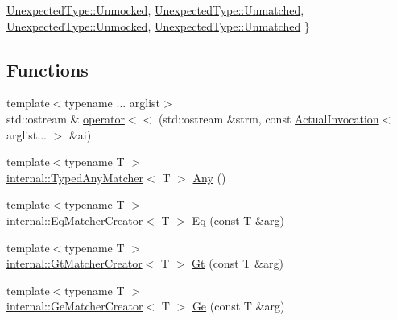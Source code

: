\begin{DoxyCompactItemize}
\mbox{\hyperlink{namespacefakeit_ae284671dc00c0fa5ee2aa4a6af02743ba064bbc63a655630608eaf0aa3814a1a0}{Unexpected\+Type\+::\+Unmocked}}, 
\mbox{\hyperlink{namespacefakeit_ae284671dc00c0fa5ee2aa4a6af02743ba164fe50bf145ff772a4229487cba0b50}{Unexpected\+Type\+::\+Unmatched}}, 
\newline
\mbox{\hyperlink{namespacefakeit_ae284671dc00c0fa5ee2aa4a6af02743ba064bbc63a655630608eaf0aa3814a1a0}{Unexpected\+Type\+::\+Unmocked}}, 
\mbox{\hyperlink{namespacefakeit_ae284671dc00c0fa5ee2aa4a6af02743ba164fe50bf145ff772a4229487cba0b50}{Unexpected\+Type\+::\+Unmatched}}
 \}
\end{DoxyCompactItemize}
\subsection*{Functions}
\begin{DoxyCompactItemize}
\item 
{\footnotesize template$<$typename ... arglist$>$ }\\std\+::ostream \& \mbox{\hyperlink{namespacefakeit_a8d9a39c37cdad511bffe2a3791fdac48}{operator$<$$<$}} (std\+::ostream \&strm, const \mbox{\hyperlink{structfakeit_1_1ActualInvocation}{Actual\+Invocation}}$<$ arglist... $>$ \&ai)
\item 
{\footnotesize template$<$typename T $>$ }\\\mbox{\hyperlink{structfakeit_1_1internal_1_1TypedAnyMatcher}{internal\+::\+Typed\+Any\+Matcher}}$<$ T $>$ \mbox{\hyperlink{namespacefakeit_a90c2af0f730a82d62e89e84466d60aac}{Any}} ()
\item 
{\footnotesize template$<$typename T $>$ }\\\mbox{\hyperlink{structfakeit_1_1internal_1_1EqMatcherCreator}{internal\+::\+Eq\+Matcher\+Creator}}$<$ T $>$ \mbox{\hyperlink{namespacefakeit_aee3892f58c0ed1c1d4aa7575c95d52c7}{Eq}} (const T \&arg)
\item 
{\footnotesize template$<$typename T $>$ }\\\mbox{\hyperlink{structfakeit_1_1internal_1_1GtMatcherCreator}{internal\+::\+Gt\+Matcher\+Creator}}$<$ T $>$ \mbox{\hyperlink{namespacefakeit_a319a253682ec7c12cba048db91165f2f}{Gt}} (const T \&arg)
\item 
{\footnotesize template$<$typename T $>$ }\\\mbox{\hyperlink{structfakeit_1_1internal_1_1GeMatcherCreator}{internal\+::\+Ge\+Matcher\+Creator}}$<$ T $>$ \mbox{\hyperlink{namespacefakeit_a6381d1f6760ba2b021457f6db4f4a219}{Ge}} (const T \&arg)
\item 

\end{DoxyCompactItemize}
